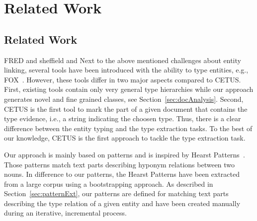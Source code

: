 \chapter{Related Work}


\section{Related Work}


\cite{oak_sheffield,fred_typing} FRED and sheffield and \cite{okechallenge}
Next to the above mentioned challenges about entity linking, several tools have been introduced with the ability to type entities, e.g., FOX~\cite{FOX}.
However, these tools differ in two major aspects compared to CETUS.
First, existing tools contain only very general type hierarchies while our approach generates novel and fine grained classes, see Section~\ref{sec:docAnalysis}.
Second, CETUS is the first tool to mark the part of a given document that contains the type evidence, i.e., a string indicating the choosen type.
Thus, there is a clear difference between the entity typing and the type extraction tasks.
To the best of our knowledge, CETUS is the first approach to tackle the type extraction task.

Our approach is mainly based on patterns and is inspired by  Hearst Patterns~\cite{Hearst1992}.
Those patterns match text parts describing hyponym relations between two nouns.
In difference to our patterns, the Hearst Patterns have been extracted from a large corpus using a bootstrapping approach.
As described in Section~\ref{sec:patternExt}, our patterns are defined for matching text parts describing the type relation of a given entity and have been created manually during an iterative, incremental process.



